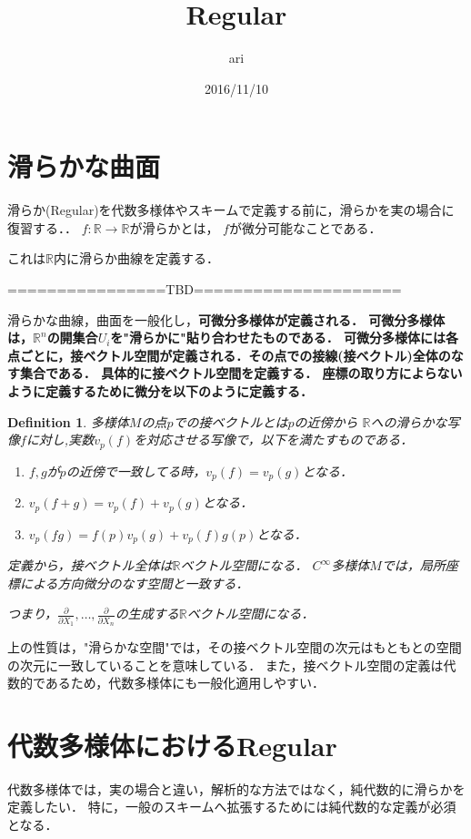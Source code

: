 \documentclass{ujarticle}
\title{Regular}
\author{ari}
\date{2016/11/10}
\newtheorem{dfn}[thm]{Definition}
\begin{document}
\maketitle
\tableofcontents


\section{滑らかな曲面}
\label{sec:Regular}
滑らか(Regular)を代数多様体やスキームで定義する前に，滑らかを実の場合に復習する．．
$f:\mathbb{R} \to \mathbb{R}$が滑らかとは，
$f$が微分可能なことである．

これは$\mathbb{R}$内に滑らか曲線を定義する．


  ================TBD=====================

滑らかな曲線，曲面を一般化し，\bf{可微分多様体}が定義される．
可微分多様体は，$\mathbb{R}^n$の開集合$U_i$を"滑らかに"貼り合わせたものである．
可微分多様体には各点ごとに，接ベクトル空間が定義される．その点での接線(接ベクトル)全体のなす集合である．
具体的に接ベクトル空間を定義する．
座標の取り方によらないように定義するために微分を以下のように定義する．

\begin{dfn}
多様体$M$の点$p$での接ベクトルとは$p$の近傍から $\mathbb{R}$への滑らかな写像$f$に対し,実数$v_p(f)$を対応させる写像で，以下を満たすものである．
\begin{enumerate}
  \item $f,g$が$p$の近傍で一致してる時，$v_p(f)=v_p(g)$となる．
  \item $v_p(f+g)=v_p(f) +v_p(g)$となる．
  \item $v_p(fg)=f(p)v_p(g)+v_p(f)g(p)$となる．
\end{enumerate}
定義から，接ベクトル全体は$\mathbb{R}$ベクトル空間になる．
$C^{\infty}$多様体$M$では，局所座標による方向微分のなす空間と一致する．

つまり，$ \frac{ \partial }{ \partial X_1}, \dots , \frac{ \partial }{ \partial X_n}$の生成する$\mathbb{R}$ベクトル空間になる．
\end{dfn}

上の性質は，"滑らかな空間"では，その接ベクトル空間の次元はもともとの空間の次元に一致していることを意味している．
また，接ベクトル空間の定義は代数的であるため，代数多様体にも一般化適用しやすい．



\section{代数多様体におけるRegular}
\label{sec:代数多様体のRegular}
代数多様体では，実の場合と違い，解析的な方法ではなく，純代数的に滑らかを定義したい．
特に，一般のスキームへ拡張するためには純代数的な定義が必須となる．
\end{document}
